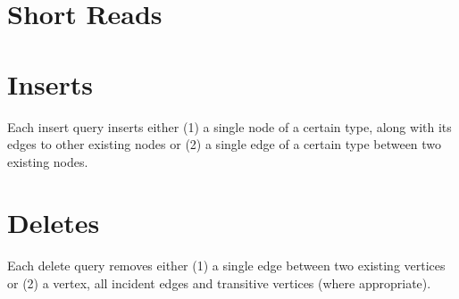 
\section{Short Reads}
\label{sec:short-reads}










\section{Inserts}
\label{sec:inserts}

Each insert query inserts either (1) a single node of a certain type, along with its edges to other existing nodes or (2) a single edge of a certain type between two existing nodes.










\section{Deletes}
\label{sec:deletes}

Each delete query removes either (1) a single edge between two existing vertices or (2) a vertex, all incident edges and transitive vertices (where appropriate).










\renewcommand{\currentQueryCard}{0}
